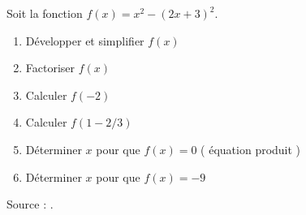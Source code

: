 
\begin{exercice}\label{exoSeconde-0052}

    Soit la fonction \( f(x)=x^2-(2x+3)^2\).
    \begin{enumerate}
        \item
 Développer et simplifier $f(x)$
 \item
 Factoriser $f(x)$
\item
 Calculer $f(-2)$ 
 \item
 Calculer $f(1-2/3)$
 \item
 Déterminer $x$ pour que $f(x)=0$ ( équation produit ) 
 \item
 Déterminer $x$ pour que $f(x)=-9$
            
    \end{enumerate}
Source : \cite{mVKzlq}.

\end{exercice}
